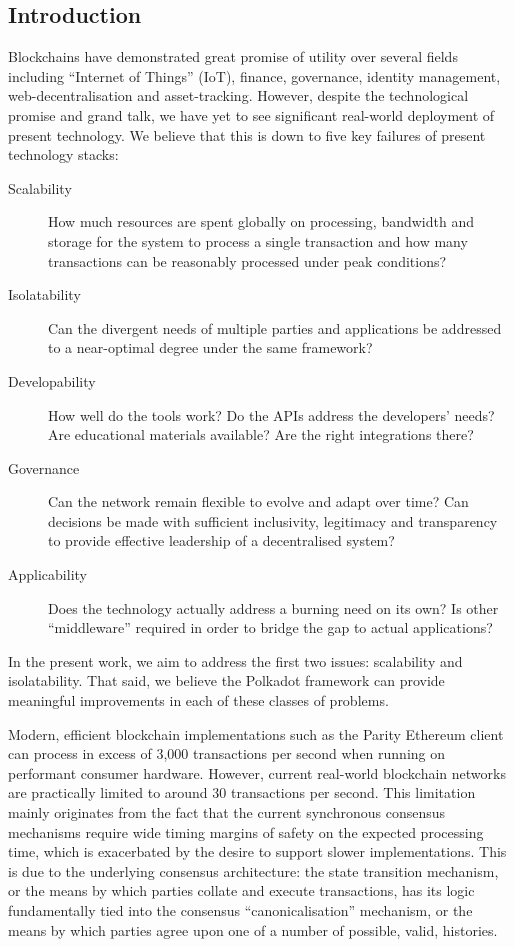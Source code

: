 \documentclass[t,usepdftitle=false]{beamer}
\begin{document}
\begin{frame}
\section{Introduction}\label{introduction}

 Blockchains have demonstrated great promise of utility over several fields including ``Internet of Things'' (IoT), finance, governance, identity management, web-decentralisation and asset-tracking. However, despite the technological promise and grand talk, we have yet to see significant real-world deployment of present technology. We believe that this is down to five key failures of present technology stacks:

\begin{description}
\item[Scalability] How much resources are spent globally on processing, bandwidth and storage for the system to process a single transaction and how many transactions can be reasonably processed under peak conditions?
\item[Isolatability] Can the divergent needs of multiple parties and applications be addressed to a near-optimal degree under the same framework?
\item[Developability] How well do the tools work? Do the APIs address the developers' needs? Are educational materials available? Are the right integrations there?
\item[Governance] Can the network remain flexible to evolve and adapt over time? Can decisions be made with sufficient inclusivity, legitimacy and transparency to provide effective leadership of a decentralised system?
\item[Applicability] Does the technology actually address a burning need on its own? Is other ``middleware'' required in order to bridge the gap to actual applications?
\end{description}

 In the present work, we aim to address the first two issues: scalability and isolatability. That said, we believe the Polkadot framework can provide meaningful improvements in each of these classes of problems.

Modern, efficient blockchain implementations such as the Parity Ethereum client\cite{parity} can process in excess of 3,000 transactions per second when running on performant consumer hardware. However, current real-world blockchain networks are practically limited to around 30 transactions per second. This limitation mainly originates from the fact that the current synchronous consensus mechanisms require wide timing margins of safety on the expected processing time, which is exacerbated by the desire to support slower implementations. This is due to the underlying consensus architecture: the state transition mechanism, or the means by which parties collate and execute transactions, has its logic fundamentally tied into the consensus ``canonicalisation'' mechanism, or the means by which parties agree upon one of a number of possible, valid, histories.


\end{frame}
\end{document}
